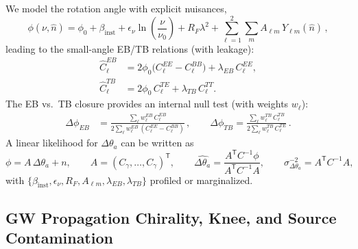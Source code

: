 \documentclass[11pt]{article}
\begin{document}
We model the rotation angle with explicit nuisances,
\begin{equation}
\label{eq:phi_nuis}
\phi(\nu,\hat{n}) = \phi_0 + \beta_{\mathrm{inst}} + \epsilon_\nu \ln\!\left(\frac{\nu}{\nu_0}\right) + R_F \lambda^2 + \sum_{\ell=1}^2 \sum_m A_{\ell m}\, Y_{\ell m}(\hat{n})\, ,
\end{equation}
leading to the small-angle EB/TB relations (with leakage):
\begin{align}
\hat{C}^{EB}_\ell &= 2\phi_0 \big(C^{EE}_\ell - C^{BB}_\ell\big) + \lambda_{EB}\, C^{EE}_\ell, \\
\hat{C}^{TB}_\ell &= 2\phi_0\, C^{TE}_\ell + \lambda_{TB}\, C^{TT}_\ell.
\end{align}
The EB vs.\ TB closure provides an internal null test (with weights $w_\ell$):
\begin{align}
\Delta \phi_{EB} &= \frac{\sum_\ell w^{EB}_\ell\, C^{EB}_\ell}{2\sum_\ell w^{EB}_\ell\,(C^{EE}_\ell - C^{BB}_\ell)}\, , \qquad
\Delta \phi_{TB} = \frac{\sum_\ell w^{TB}_\ell\, C^{TB}_\ell}{2\sum_\ell w^{TB}_\ell\, C^{TE}_\ell}\, .
\end{align}
A linear likelihood for $\Delta\theta_a$ can be written as
\begin{equation}
\phi = A\,\Delta\theta_a + n,\qquad A = (C_\gamma,\dots,C_\gamma)^{\mathsf T},\qquad 
\widehat{\Delta\theta_a} = \frac{A^{\mathsf T} C^{-1}\phi}{A^{\mathsf T} C^{-1} A},\qquad
\sigma_{\Delta\theta_a}^{-2} = A^{\mathsf T} C^{-1} A,
\end{equation}
with $\{\beta_{\mathrm{inst}},\epsilon_\nu,R_F,A_{\ell m},\lambda_{EB},\lambda_{TB}\}$ profiled or marginalized.

\subsection{GW Propagation Chirality, Knee, and Source Contamination}
\end{document}
